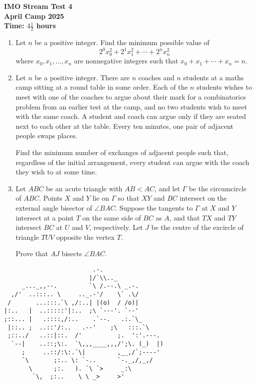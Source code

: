 \documentclass[12pt]{article}
\begin{document}
\thispagestyle{empty}

\begin{center} \bfseries
  \Large IMO Stream Test 4
  \\ \bigskip
  \large April Camp 2025
  \\ \bigskip
  Time: $4\frac{1}{2}$ hours
\end{center}

\bigskip\bigskip
\begin{enumerate}[leftmargin=0pt,itemsep=\bigskipamount]

\item Let $n$ be a positive integer.
Find the minimum possible value of
\[2^0x_0^2 + 2^1x_1^2 + \dotsb + 2^{n}x_{n}^2\]
where $x_0,x_1,\dotsc,x_{n}$ are nonnegative integers such that $x_0 + x_1 + \cdots + x_{n} = n$.

\item Let $n$ be a positive integer.
There are $n$ coaches and $n$ students at a maths camp sitting at a round table in some order.
Each of the $n$ students wishes to meet with one of the coaches to argue about their mark for a combinatorics problem from an earlier test at the camp, and no two students wish to meet with the same coach.
A student and coach can argue only if they are seated next to each other at the table.
Every ten minutes, one pair of adjacent people swaps places.

Find the minimum number of exchanges of adjacent people such that, regardless of the initial arrangement, every student can argue with the coach they wish to at some time.

\item Let $ABC$ be an acute triangle with $AB<AC$, and let $\Gamma$ be the circumcircle of $ABC$.
Points $X$ and $Y$ lie on $\Gamma$ so that $XY$ and $BC$ intersect on the external angle bisector of $\angle BAC$.
Suppose the tangents to $\Gamma$ at $X$ and $Y$ intersect at a point $T$ on the same side of $BC$ as $A$, and that $TX$ and $TY$ intersect $BC$ at $U$ and $V$, respectively.
Let $J$ be the centre of the excircle of triangle $TUV$ opposite the vertex $T$.

Prove that $AJ$ bisects $\angle BAC$.

\end{enumerate}


\vfill
\centering
\scriptsize %
\begin{BVerbatim}
                         .-.
                        |/`\\.._
     _..._,,--.         `\ /.--.\ _.-. 
  ,/'  ..:::.. \     .._.-'/    \` .\/ 
 /       ...:::.`\ ,/:..| |(o)  / /o)|
|:..   |  ..:::::'|:..  ;\ `---'. `--'
;::... |   .::::,/:..    .`--.   .:.`\_
 |::.. ;  ..::'/:..   .--'    ;\   :::.`\
 ;::../   ..::|::.  /'          ;.  ':'.---.
  `--|    ..::;\:.  `\,,,____,,,/';\. (_)  |)
     ;     ..::/:\:.`\|         ,__,/`;----'
     `\       ;:.. \: `-..      `-._,/,_,/
       \      ;:.   ). `\ `>     _:\
        `\,  ;:..    \ \ _>     >'
\end{BVerbatim}
\end{document}
